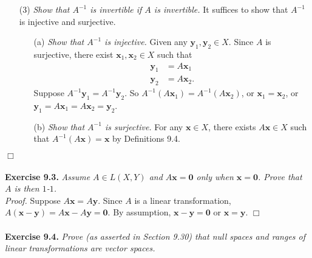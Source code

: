 \documentclass{article}
\begin{document}
\begin{enumerate}
\item[(3)]
  \emph{Show that $A^{-1}$ is invertible if $A$ is invertible.}
  It suffices to show that $A^{-1}$ is injective and surjective.
  \begin{enumerate}
  \item[(a)]
    \emph{Show that $A^{-1}$ is injective.}
    Given any $\mathbf{y}_1, \mathbf{y}_2 \in X$.
    Since $A$ is surjective,
    there exist $\mathbf{x}_1, \mathbf{x}_2 \in X$ such that
    \begin{align*}
      \mathbf{y}_1 &= A\mathbf{x}_1 \\
      \mathbf{y}_2 &= A\mathbf{x}_2.
    \end{align*}
    Suppose $A^{-1}\mathbf{y}_1 = A^{-1}\mathbf{y}_2$.
    So $A^{-1}(A\mathbf{x}_1) = A^{-1}(A\mathbf{x}_2)$,
    or $\mathbf{x}_1 = \mathbf{x}_2$,
    or $\mathbf{y}_1 = A\mathbf{x}_1 = A\mathbf{x}_2 = \mathbf{y}_2$.

  \item[(b)]
    \emph{Show that $A^{-1}$ is surjective.}
    For any $\mathbf{x} \in X$, there exists $A\mathbf{x} \in X$ such that
    $A^{-1}(A\mathbf{x}) = \mathbf{x}$ by Definitions 9.4.
  \end{enumerate}
\end{enumerate}
$\Box$ \\\\






\textbf{Exercise 9.3.}
\emph{Assume $A \in L(X,Y)$ and $A\mathbf{x} = \mathbf{0}$ only when $\mathbf{x} = \mathbf{0}$.
Prove that $A$ is then $1$-$1$.} \\

\emph{Proof.}
Suppose $A\mathbf{x} = A\mathbf{y}$.
Since $A$ is a linear transformation,
$A(\mathbf{x}-\mathbf{y}) = A\mathbf{x} - A\mathbf{y} = \mathbf{0}$.
By assumption, $\mathbf{x}-\mathbf{y} = \mathbf{0}$
or $\mathbf{x} = \mathbf{y}$.
$\Box$ \\\\






\textbf{Exercise 9.4.}
\emph{Prove (as asserted in Section 9.30) that null spaces and ranges of
linear transformations are vector spaces.} \\
\end{document}

